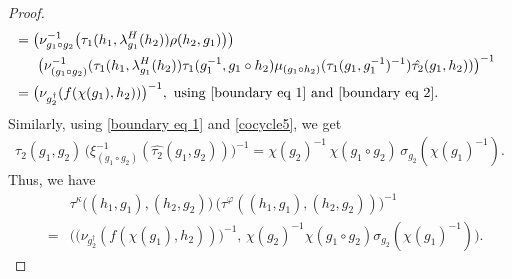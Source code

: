 \documentclass{jonasart}
\theoremstyle{plain}
\begin{document}
\begin{proof}
\begin{align*}
			&\!\!\!\!=\big(\nu^{-1}_{g_1\circ g_2}\big(\tau_1(h_1,\lambda^H_{g_1}(h_2))\rho(h_2,g_1)\big)\big) \\ &\quad\big(\nu^{-1}_{(g_1\circ g_2)}(\tau_1(h_1,\lambda^H_{g_1}(h_2))\tau_1(g_1^{-1},g_1\circ h_2) \mu_{(g_1\circ h_2)}(\tau_1(g_1,g_1^{-1})^{-1})	\hat{\tau_2}(g_1, h_2))	\big)^{-1}\\
			&\!\!\!\!=\big(\nu_{g_2^\dagger}(f(\chi(g_1),h_2))\big)^{-1}, \text{ using \eqref{boundary eq 1} and \eqref{boundary eq 2}.}
		\end{align*}
		Similarly, using \eqref{boundary eq 1} and \eqref{cocycle5}, we get
		\begin{eqnarray}
			\tau_2(g_1,g_2) \, \big(\xi^{-1}_{(g_1\circ g_2)}(	\hat{\tau_2}(g_1,g_2)) \big)^{-1}=\chi(g_2)^{-1} \, \chi(g_1\circ g_2) \, \sigma_{g_2}(\chi(g_1)^{-1}).\label{tau tau tilde rel}
		\end{eqnarray}
		Thus, we have
		\begin{eqnarray}
			&&\tau^\kappa \big((h_1,g_1),(h_2,g_2)\big) \, \big(\tau^\varphi((h_1,g_1),(h_2,g_2))\big)^{-1}\nonumber\\
			&=&\big( \big(\nu_{g_2^\dagger}(f(\chi(g_1),h_2))\big)^{-1},\,	\chi(g_2)^{-1}\chi(g_1\circ g_2)\sigma_{g_2}(\chi(g_1)^{-1})\big).\label{tau 1 prime tau 2 prime inverse 1}
		\end{eqnarray}
		

\end{proof}
\end{document}
